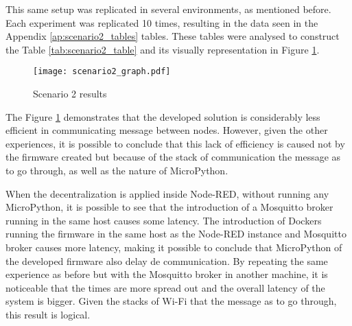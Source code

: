 This same setup was replicated in several environments, as mentioned before. Each experiment was replicated 10 times, resulting in the data seen in the Appendix \ref{ap:scenario2_tables} tables. These tables were analysed to construct the Table \ref{tab:scenario2_table} and its visually representation in Figure \ref{fig:scenario2_candlestick}.

\captionsetup{belowskip=12pt,aboveskip=4pt}
\begin{table}[ht]
    \centering
    \caption{Scenario 2 results}
    \label{tab:scenario2_table}
\end{table}{}

\begin{figure}[h]
\centering
\texttt{[image: scenario2\_graph.pdf]}
\caption[Scenario 2 results]{Scenario 2 results}\label{fig:scenario2_candlestick}
\end{figure}

The Figure \ref{fig:scenario2_candlestick} demonstrates that the developed solution is considerably less efficient in communicating message between nodes. However, given the other experiences, it is possible to conclude that this lack of efficiency is caused not by the firmware created but because of the stack of communication the message as to go through, as well as the nature of MicroPython. 

When the decentralization is applied inside Node-RED, without running any MicroPython, it is possible to see that the introduction of a Mosquitto broker running in the same host causes some latency. The introduction of Dockers running the firmware in the same host as the Node-RED instance and Mosquitto broker causes more latency, making it possible to conclude that MicroPython of the developed firmware also delay de communication. By repeating the same experience as before but with the Mosquitto broker in another machine, it is noticeable that the times are more spread out and the overall latency of the system is bigger. Given the stacks of Wi-Fi that the message as to go through, this result is logical.

